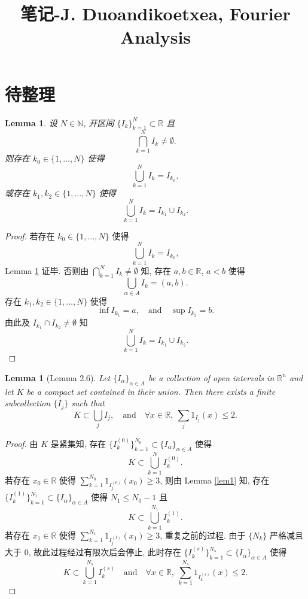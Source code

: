\documentclass[a4paper,11pt]{article}
\title{笔记-J. Duoandikoetxea, Fourier Analysis}
\newtheorem{lemma}[theorem]{Lemma}
\theoremstyle{definition}
\begin{document}
\maketitle

\section{待整理}

\begin{lemma} \label{h2}
    设 $ N \in \mathbb{N} $, 开区间 $ \{I_k\}_{k = 1}^N \subset \mathbb{R} $ 且
    $$
        \bigcap_{k = 1}^N I_k \neq \emptyset.
    $$
    则存在 $ k_0 \in \{1, \ldots, N\} $ 使得
    $$
        \bigcup_{k = 1}^N I_k = I_{k_0},
    $$
    或存在 $ k_1, k_2 \in \{1, \ldots, N\} $ 使得
    $$
        \bigcup_{k = 1}^N I_k = I_{k_1} \cup I_{k_2}.
    $$
\end{lemma}

\begin{proof}
    若存在 $ k_0 \in \{1, \ldots, N\} $ 使得
    $$
        \bigcup_{k = 1}^N I_k = I_{k_0},
    $$
    Lemma \ref{h2} 证毕. 
    否则由 $ \bigcap_{k = 1}^N I_k \neq \emptyset $ 知, 
    存在 $ a, b \in \mathbb{R} $, $ a < b $ 使得
    $$
        \bigcup_{\alpha \in A} I_k = (a, b).
    $$
    存在 $ k_1, k_2 \in \{1, \ldots, N\} $ 使得
    $$
        \inf I_{k_1} = a, \quad \text{and} \quad \sup I_{k_2} = b.
    $$
    由此及 $ I_{k_1} \cap I_{k_2} \neq \emptyset $ 知
    $$
        \bigcup_{k = 1}^N I_k = I_{k_1} \cup I_{k_2}.
    $$
\end{proof}

\begin{lemma}[Lemma 2.6]
    Let $ \{ I_\alpha \}_{\alpha \in A} $ be a collection of open intervals in $ \mathbb{R}^n $ 
    and let $ K $ be a compact set contained in their union. Then there exists a finite subcollection
    $ \{ I_j \} $ such that
    $$
        K \subset \bigcup_j I_j, \quad \text{and} \quad 
        \forall x \in \mathbb{R},\ \sum_j \mathrm{1}_{I_j} (x) \leq 2.
    $$
\end{lemma}

\begin{proof}
    由 $ K $ 是紧集知, 存在 $ \{I_k^{(0)}\}_{k = 1}^{N_0} \subset \{ I_\alpha \}_{\alpha \in A} $ 使得
    $$
        K \subset \bigcup_{k = 1}^N I_k^{(0)}.
    $$
    若存在 $ x_0 \in \mathbb{R} $ 使得 $ \sum_{k = 1}^{N_0} \mathrm{1}_{I_j^{(0)}} (x_0) \geq 3 $, 
    则由 Lemma \ref{lem1} 知,
    存在 $ \{I_k^{(1)}\}_{k = 1}^{N_1} \subset \{ I_\alpha \}_{\alpha \in A} $ 使得 $ N_1 \leq N_0 - 1 $ 且
    $$
        K \subset \bigcup_{k = 1}^{N_1} I_k^{(1)}.
    $$
    若存在 $ x_1 \in \mathbb{R} $ 使得 $ \sum_{k = 1}^{N_1} \mathrm{1}_{I_j^{(1)}} (x_1) \geq 3 $, 重复之前的过程.
    由于 $ \{N_k\} $ 严格减且大于 $ 0 $,
    故此过程经过有限次后会停止, 此时存在 $ \{I_k^{(s)}\}_{k = 1}^{N_s} \subset \{ I_\alpha \}_{\alpha \in A} $ 使得
    $$
        K \subset \bigcup_{k = 1}^{N_s} I_k^{(s)} \quad \text{and} \quad 
        \forall x \in \mathbb{R},\ \sum_{k = 1}^{N_s} \mathrm{1}_{I_k^{(s)}} (x) \leq 2.
    $$
\end{proof}
\end{document}
